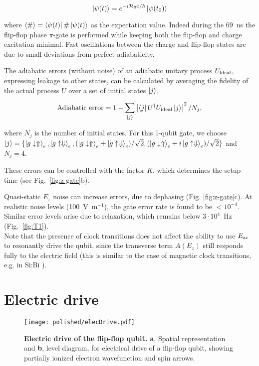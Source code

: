 \begin{equation}
\ket{\psi(t)}=e^{-i \mathcal{H}_{\rm ff} t/\hbar}\ket{\psi(t_0)}
\end{equation}

where $\langle \#\rangle=\bra{\psi(t)}\#\ket{\psi(t)}$ as the expectation value. Indeed during the 69~ns the flip-flop phase $\pi$-gate is performed while keeping both the flip-flop and charge excitation minimal. Fast oscillations between the charge and flip-flop states are due to small deviations from perfect adiabaticity. 

The adiabatic errors (without noise) of an adiabatic unitary process $U_{\rm ideal}$, expressing leakage to other states, can be calculated by averaging the fidelity of the actual process $U$ over a set of initial states $\ket{j}$,

\begin{equation}\label{eq:adError}
{\rm Adiabatic~error}=1-\sum\limits_{\ket{j}}{\left|\bra{j}U^\dagger U_{\rm ideal}\ket{j}\right|^2/N_j},
\end{equation}

where $N_j$ is the number of initial states. For this 1-qubit gate, we choose $\ket{j}=\{\ket{g\downarrow\Uparrow}_e,\ket{g\uparrow\Downarrow}_e,(\ket{g\downarrow\Uparrow}_e+\ket{g\uparrow\Downarrow}_e)/\sqrt{2},(\ket{g\downarrow\Uparrow}_e+i\ket{g\uparrow\Downarrow}_e)/\sqrt{2}\}$ and $N_j=4$. 

These errors can be controlled with the factor $K$, which determines the setup time (see Fig.~\ref{fig:z-gate}b).

Quasi-static $E_z$ noise can increase errors, due to dephasing (Fig. \ref{fig:z-gate}c). At realistic noise levels (100~V~m$^{-1}$), the gate error rate is found to be $<10^{-4}$. Similar error levels arise due to relaxation, which remains below $3\cdot 10^4$~Hz (Fig.~\ref{fig:T1}).\\

Note that the presence of clock transitions does not affect the ability to use $E_{\rm ac}$ to resonantly drive the qubit, since the transverse term $A(E_z)$ still responds fully to the electric field (this is similar to the case of magnetic clock transitions, e.g. in Si:Bi \cite{Wolfowicz2013}).


\section{Electric drive} \label{sec:elecDrive}

\begin{figure}[h]
	\centering
	\texttt{[image: polished/elecDrive.pdf]}
	\caption[Electric drive of the flip-flop qubit]{\textbf{Electric drive of the flip-flop qubit. a}, Spatial representation and \textbf{b}, level diagram, for electrical drive of a flip-flop qubit, showing partially ionized electron wavefunction and spin arrows.}
		\label{fig:elec_drive}
\end{figure}


